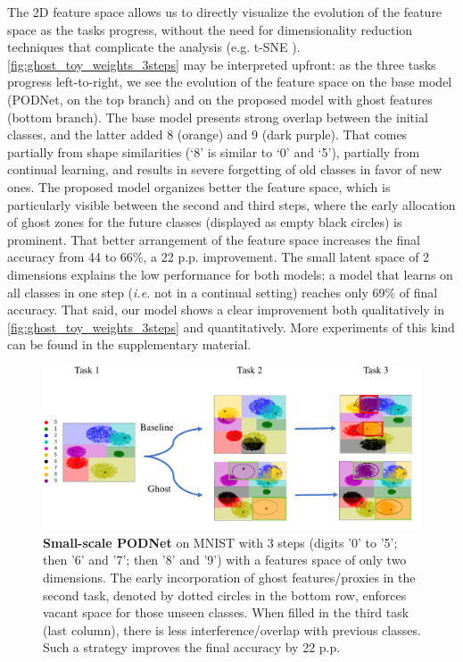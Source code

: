 The 2D feature space allows us to directly visualize the evolution of the feature space as the tasks
progress, without the need for dimensionality reduction techniques that complicate the analysis
(e.g. t-SNE \citep{maaten2008tsne}). \autoref{fig:ghost_toy_weights_3steps} may be interpreted
upfront: as the three tasks progress left-to-right, we see the evolution of the feature space on the
base model (\ac{PODNet}, on the top branch) and on the proposed model with ghost features (bottom
branch). The base model presents strong overlap between the initial classes, and the latter added  8
({\color{orange}orange}) and 9 ({\color{violet}dark purple}). That comes partially from shape
similarities (‘8’ is similar to ‘0’ and ‘5’), partially from continual learning, and results in
severe forgetting of old classes in favor of new ones. The proposed model organizes better the
feature space, which is particularly visible between the second and third steps, where the early
allocation of ghost zones for the future classes (displayed as empty black circles) is prominent.
That better arrangement of the feature space increases the final accuracy from 44 to 66\%, a 22 p.p.
improvement. The small latent space of 2 dimensions explains the low performance for both models; a
model that learns on all classes in one step (\textit{i.e.} not in a continual setting) reaches only
69\% of final accuracy. That said, our model shows a clear improvement both qualitatively in
\autoref{fig:ghost_toy_weights_3steps} and quantitatively. More experiments of this kind can be
found in the supplementary material.

\begin{figure}
    \centering
    \includegraphics[width=0.8\linewidth]{images/ghost/toy_model_6_2_2.pdf}
    \caption{\textbf{Small-scale PODNet} on MNIST with 3 steps (digits '0' to '5'; then '6' and '7';
        then '8' and '9') with a features space of only two dimensions. The early incorporation of
        ghost features/proxies in the second task, denoted by dotted circles in the bottom row,
        enforces vacant space for those unseen classes. When filled in the third task (last column),
        there is less interference/overlap with previous classes. Such a strategy improves the final
        accuracy by 22 p.p.}
    \label{fig:ghost_toy_weights_3steps}
\end{figure}

